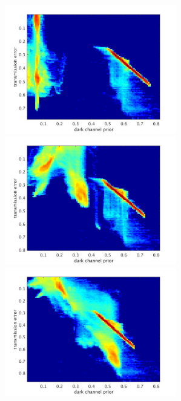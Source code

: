 \begin{figure}[ht]
\begin{minipage}[b]{0.45\linewidth}
  \centering
  \centerline{\includegraphics[width=7.5cm]{hazerd/scatterhist/50}}
\end{minipage}
%
\hfill
\begin{minipage}[b]{0.45\linewidth}
  \centering
  \centerline{\includegraphics[width=7.5cm]{hazerd/scatterhist/200}}
\end{minipage}
\hfill
\begin{minipage}[b]{0.45\linewidth}
  \centering
  \centerline{\includegraphics[width=7.5cm]{hazerd/scatterhist/500}}
\end{minipage}

\end{figure}
